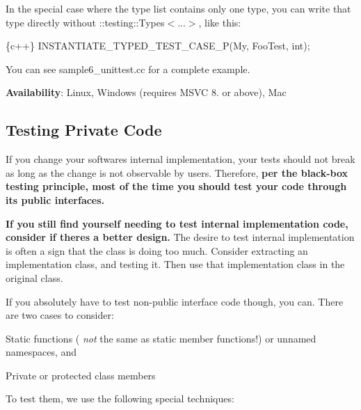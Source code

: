 In the special case where the type list contains only one type, you can write that type directly without {\ttfamily \+::testing\+::\+Types$<$...$>$}, like this\+:


\begin{DoxyCode}
\{c++\}
INSTANTIATE\_TYPED\_TEST\_CASE\_P(My, FooTest, int);
\end{DoxyCode}


You can see {\ttfamily sample6\+\_\+unittest.\+cc} for a complete example.

{\bfseries Availability}\+: Linux, Windows (requires M\+S\+VC 8. or above), Mac

\subsection*{Testing Private Code}

If you change your software\textquotesingle{}s internal implementation, your tests should not break as long as the change is not observable by users. Therefore, {\bfseries per the black-\/box testing principle, most of the time you should test your code through its public interfaces.}

{\bfseries If you still find yourself needing to test internal implementation code, consider if there\textquotesingle{}s a better design.} The desire to test internal implementation is often a sign that the class is doing too much. Consider extracting an implementation class, and testing it. Then use that implementation class in the original class.

If you absolutely have to test non-\/public interface code though, you can. There are two cases to consider\+:


\begin{DoxyItemize}
\item Static functions ( {\itshape not} the same as static member functions!) or unnamed namespaces, and
\item Private or protected class members
\end{DoxyItemize}

To test them, we use the following special techniques\+:


